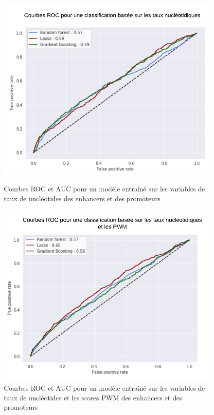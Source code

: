 \documentclass[french]{llncs}
\begin{document}
\begin{figure}[!htb]
    \centering
    \begin{minipage}[t]{.5\textwidth}
        \centering
        \includegraphics[width=1\linewidth]{Images_FANTOM/rocs_fantom_ep_nucl.png}
        \caption{Courbes ROC et AUC pour un modèle entraîné sur les variables de taux de nucléotides des enhancers et des promoteurs}
        \label{fig:rocs_fantom_ep_nucl}
    \end{minipage}%
    \begin{minipage}[t]{.5\textwidth}
        \centering
        \includegraphics[width=1\linewidth]{Images_FANTOM/rocs_fantom_ep_nucl_pwm.png}
        \caption{Courbes ROC et AUC pour un modèle entraîné sur les variables de taux de nucléotides et les scores PWM des enhancers et des promoteurs}
        \label{fig:rocs_fantom_ep_nucl_pwm}
    \end{minipage}
\end{figure}
\end{document}
